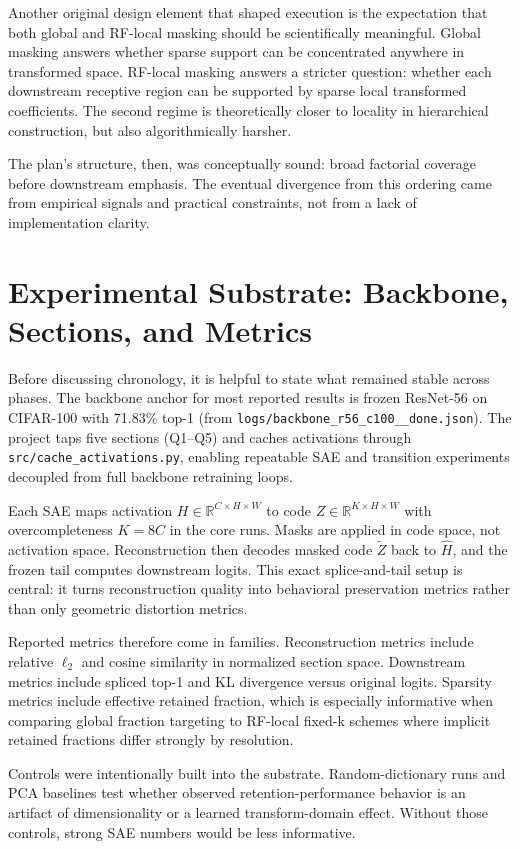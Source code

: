 \documentclass[11pt]{article}
\begin{document}
Another original design element that shaped execution is the expectation that both global and RF-local masking should be scientifically meaningful. Global masking answers whether sparse support can be concentrated anywhere in transformed space. RF-local masking answers a stricter question: whether each downstream receptive region can be supported by sparse local transformed coefficients. The second regime is theoretically closer to locality in hierarchical construction, but also algorithmically harsher.

The plan's structure, then, was conceptually sound: broad factorial coverage before downstream emphasis. The eventual divergence from this ordering came from empirical signals and practical constraints, not from a lack of implementation clarity.

\section{Experimental Substrate: Backbone, Sections, and Metrics}
Before discussing chronology, it is helpful to state what remained stable across phases. The backbone anchor for most reported results is frozen ResNet-56 on CIFAR-100 with 71.83\% top-1 (from \texttt{logs/backbone\_r56\_c100\_\_done.json}). The project taps five sections (Q1--Q5) and caches activations through \texttt{src/cache\_activations.py}, enabling repeatable SAE and transition experiments decoupled from full backbone retraining loops.

Each SAE maps activation $H\in\mathbb{R}^{C\times H\times W}$ to code $Z\in\mathbb{R}^{K\times H\times W}$ with overcompleteness $K=8C$ in the core runs. Masks are applied in code space, not activation space. Reconstruction then decodes masked code $\tilde{Z}$ back to $\hat{H}$, and the frozen tail computes downstream logits. This exact splice-and-tail setup is central: it turns reconstruction quality into behavioral preservation metrics rather than only geometric distortion metrics.

Reported metrics therefore come in families. Reconstruction metrics include relative $\ell_2$ and cosine similarity in normalized section space. Downstream metrics include spliced top-1 and KL divergence versus original logits. Sparsity metrics include effective retained fraction, which is especially informative when comparing global fraction targeting to RF-local fixed-k schemes where implicit retained fractions differ strongly by resolution.

Controls were intentionally built into the substrate. Random-dictionary runs and PCA baselines test whether observed retention-performance behavior is an artifact of dimensionality or a learned transform-domain effect. Without those controls, strong SAE numbers would be less informative.
\end{document}
